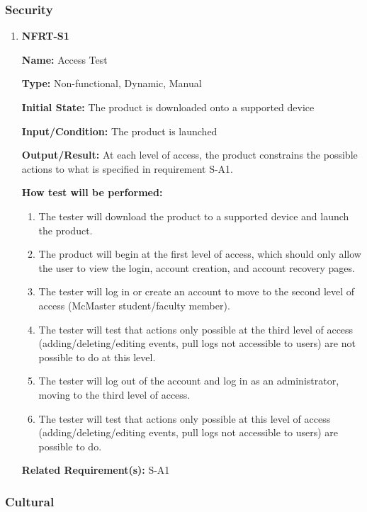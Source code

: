 \documentclass[12pt, titlepage]{article}
\begin{document}
\subsubsection{Security}

\begin{enumerate}
\item{\textbf{NFRT-S1}}

\textbf{Name:} Access Test
  
\textbf{Type:} Non-functional, Dynamic, Manual
            
\textbf{Initial State:} The product is downloaded onto a supported device
  
\textbf{Input/Condition:} The product is launched
            
\textbf{Output/Result:} At each level of access, the product constrains the possible actions to what is specified in requirement S-A1.
  
\textbf{How test will be performed:}
\begin{enumerate}
  \item The tester will download the product to a supported device and launch the product.
  \item The product will begin at the first level of access, which should only allow the user to view the login, account creation, and account recovery pages.
  \item The tester will log in or create an account to move to the second level of access (McMaster student/faculty member).
  \item The tester will test that actions only possible at the third level of access (adding/deleting/editing events, pull logs not accessible to users) are not possible to do at this level.
  \item The tester will log out of the account and log in as an administrator, moving to the third level of access.
  \item The tester will test that actions only possible at this level of access (adding/deleting/editing events, pull logs not accessible to users) are possible to do.
\end{enumerate}

\textbf{Related Requirement(s):} S-A1
\end{enumerate}

\subsubsection{Cultural}
\end{document}
